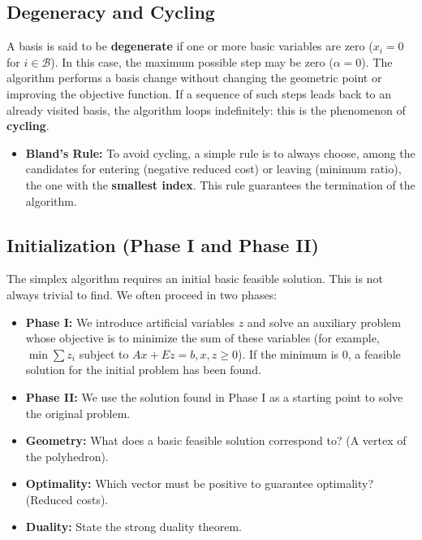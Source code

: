 \subsection{Degeneracy and Cycling}
A basis is said to be \textbf{degenerate} if one or more basic variables are zero ($x_i = 0$ for $i \in \mathcal{B}$). 
In this case, the maximum possible step may be zero ($\alpha = 0$). The algorithm performs a basis change without changing the geometric point or improving the objective function.
If a sequence of such steps leads back to an already visited basis, the algorithm loops indefinitely: this is the phenomenon of \textbf{cycling}.
\begin{itemize}
    \item \textbf{Bland's Rule:} To avoid cycling, a simple rule is to always choose, among the candidates for entering (negative reduced cost) or leaving (minimum ratio), the one with the \textbf{smallest index}. This rule guarantees the termination of the algorithm.
\end{itemize}

\subsection{Initialization (Phase I and Phase II)}
The simplex algorithm requires an initial basic feasible solution. This is not always trivial to find. We often proceed in two phases:
\begin{itemize}
    \item \textbf{Phase I:} We introduce artificial variables $z$ and solve an auxiliary problem whose objective is to minimize the sum of these variables (for example, $\min \sum z_i$ subject to $Ax + Ez = b, x,z \ge 0$). If the minimum is 0, a feasible solution for the initial problem has been found.
    \item \textbf{Phase II:} We use the solution found in Phase I as a starting point to solve the original problem.
\end{itemize}

\bigskip
\begin{checkpoint}
\begin{itemize}
    \item \textbf{Geometry:} What does a basic feasible solution correspond to? (A vertex of the polyhedron).
    \item \textbf{Optimality:} Which vector must be positive to guarantee optimality? (Reduced costs).
    \item \textbf{Duality:} State the strong duality theorem.
\end{itemize}
\end{checkpoint}
